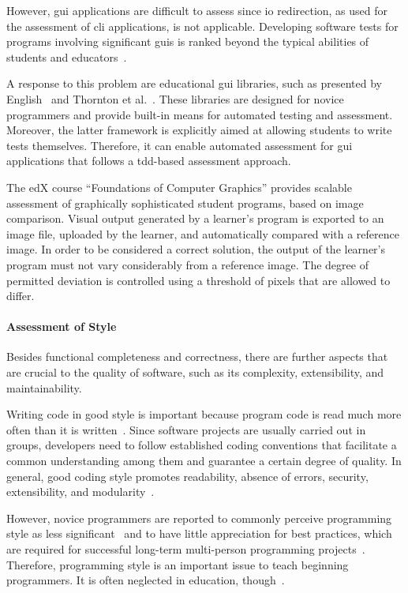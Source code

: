 However, \gls{gui} applications are difficult to assess since \gls{io} redirection, as used for the assessment of \gls{cli} applications, is not applicable. Developing software tests for programs involving significant \glspl{gui} is ranked beyond the typical abilities of students and educators~\cite{thornton2008supporting}.

A response to this problem are educational \gls{gui} libraries, such as presented by English~\cite{english2004automated} and Thornton et al.~\cite{thornton2008supporting}. These libraries are designed for novice programmers and provide built-in means for automated testing and assessment. Moreover, the latter framework is explicitly aimed at allowing students to write tests themselves. Therefore, it can enable automated assessment for \gls{gui} applications that follows a \gls{tdd}-based assessment approach.

The edX course ``Foundations of Computer Graphics'' provides scalable assessment of graphically sophisticated student programs, based on image comparison. Visual output generated by a learner's program is exported to an image file, uploaded by the learner, and automatically compared with a reference image. In order to be considered a correct solution, the output of the learner's program must not vary considerably from a reference image. The degree of permitted deviation is controlled using a threshold of pixels that are allowed to differ.

\paragraph{Assessment of Style}

Besides functional completeness and correctness, there are further aspects that are crucial to the quality of software, such as its complexity, extensibility, and maintainability.

Writing code in good style is important because program code is read much more often than it is written~\cite{rogers2014acce}. Since software projects are usually carried out in groups, developers need to follow established coding conventions that facilitate a common understanding among them and guarantee a certain degree of quality. In general, good coding style promotes readability, absence of errors, security, extensibility, and modularity~\cite{rogers2014acce}.

However, novice programmers are reported to commonly perceive programming style as less significant~\cite{ala2004supporting} and to have little appreciation for best practices, which are required for successful long-term multi-person programming projects~\cite{xiao2014multiplayer}. Therefore, programming style is an important issue to teach beginning programmers. It is often neglected in education, though~\cite{ala2004supporting}.

